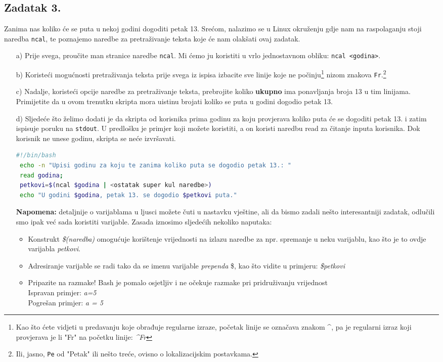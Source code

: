 \documentclass{exam}
\newcommand{\shell}[1]{\texttt{#1}}
\begin{document}
\subsection*{Zadatak 3.}
Zanima nas koliko će se puta u nekoj godini dogoditi
petak 13. Srećom, nalazimo se u Linux okruženju gdje nam na raspolaganju stoji
naredba \shell{ncal}, te poznajemo naredbe za pretraživanje teksta koje će nam
olakšati ovaj zadatak.
\begin{itemize}
  
\item[a)] Prije svega, proučite man stranice naredbe \shell{ncal}. Mi ćemo ju
  koristiti u vrlo jednostavnom obliku: \shell{ncal <godina>}.
\item[b)] Koristeći mogućnosti pretraživanja teksta prije svega iz ispisa
  izbacite sve linije koje ne počinju\footnote{Kao što ćete vidjeti u predavanju koje obrađuje regularne izraze, početak linije se označava znakom \textasciicircum, pa je regularni izraz koji provjerava je li "Fr" na početku linije: \textit{\textasciicircum Fr}} nizom znakova \shell{Fr}.\footnote{Ili,
    jasno, \shell{Pe} od "Petak" ili nešto treće, ovisno o lokalizacijskim
    postavkama.}
\item[c)] Nadalje, koristeći opcije naredbe za pretraživanje teksta, prebrojite koliko \textbf{ukupno} ima ponavljanja broja 13 u tim linijama. Primijetite da u ovom trenutku
skripta mora uistinu brojati koliko se puta u godini dogodio petak 13.

\item[d)]
  Sljedeće što želimo dodati je da skripta od korisnika prima godinu za koju
  provjerava koliko puta će se dogoditi petak 13. i zatim ispisuje poruku na
  \shell{stdout}. U predlošku je primjer koji možete koristiti, a on koristi
  naredbu read za čitanje inputa korisnika. Dok korisnik ne unese godinu, skripta
  se neće izvršavati.
\begin{lstlisting}[language=bash,caption={Čitanje inputa}]
 #!/bin/bash
 echo -n "Upisi godinu za koju te zanima koliko puta se dogodio petak 13.: "
 read godina;
 petkovi=$(ncal $godina | <ostatak super kul naredbe>)
 echo "U godini $godina, petak 13. se dogodio $petkovi puta."
\end{lstlisting}
  \textbf{Napomena: }detaljnije o varijablama u ljusci možete čuti u nastavku vještine, ali da bismo zadali nešto interesantniji zadatak, odlučili smo ipak već sada koristiti varijable. Zasada iznosimo sljedećih nekoliko naputaka:
  \begin{itemize}
    \item Konstrukt \textit{\$(naredba)} omogućuje korištenje vrijednosti na izlazu naredbe za npr. spremanje u neku varijablu, kao što je to ovdje varijabla \textit{petkovi}.
    \item Adresiranje varijable se radi tako da se imenu varijable \textit{prependa} \$, kao što vidite u primjeru: \textit{\$petkovi}
    \item Pripazite na razmake! Bash je pomalo osjetljiv i ne očekuje razmake pri pridruživanju vrijednost\\Ispravan primjer: \textit{a=5}\\
    Pogrešan primjer: \textit{a = 5}
  \end{itemize}



\end{itemize}
\end{document}
